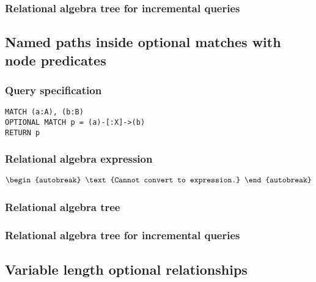 \subsubsection*{Relational algebra tree for incremental queries}


\subsection{Named paths inside optional matches with node predicates}

\subsubsection*{Query specification}

\begin{lstlisting}
MATCH (a:A), (b:B)
OPTIONAL MATCH p = (a)-[:X]->(b)
RETURN p
\end{lstlisting}

\subsubsection*{Relational algebra expression}

\begin{align*}
\begin{autobreak}
\text{Cannot convert to expression.}
\end{autobreak}
\end{align*}

\subsubsection*{Relational algebra tree}


\subsubsection*{Relational algebra tree for incremental queries}


\subsection{Variable length optional relationships}

